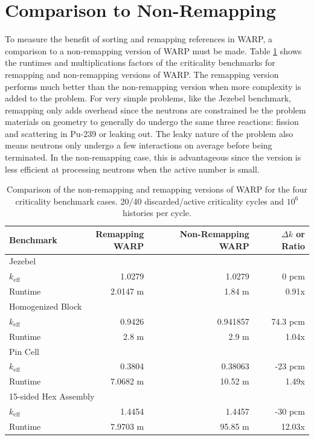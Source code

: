 \section{Comparison to Non-Remapping}

To measure the benefit of sorting and remapping references in WARP, a comparison to a non-remapping version of WARP must be made.  Table \ref{benchmark_nonremapping_summary} shows the runtimes and multiplications factors of the criticality benchmarks for remapping and non-remapping versions of WARP.  The remapping version performs much better than the non-remapping version when more complexity is added to the problem.  For very simple problems, like the Jezebel benchmark, remapping only adds overhead since the neutrons are constrained be the problem materials on geometry to generally do undergo the same three reactions: fission and scattering in Pu-239 or leaking out.  The leaky nature of the problem also means neutrons only undergo a few interactions on average before being terminated.  In the non-remapping case, this is advantageous since the version is less efficient at processing neutrons when the active number is small.

\begin{table}[h]
\centering
\caption{Comparison of the non-remapping and remapping versions of WARP for the four criticality benchmark cases.  20/40 discarded/active criticality cycles and $10^6$ histories per cycle.}
\label{benchmark_nonremapping_summary}
\begin{tabular}{| l | r | r | r |}
 \hline
 Benchmark & Remapping WARP & Non-Remapping WARP & $\Delta k$ or Ratio  \\
\hline
\hline
\multicolumn{4}{|l|}{Jezebel}  \\
\hline
 $k_\mathrm{eff}$ & 1.0279 & 1.0279  & 0 pcm\\
 \hline
 Runtime               &   2.0147 m & 1.84 m & 0.91x \\
 \hline
 \hline
\multicolumn{4}{|l|}{Homogenized Block }\\
\hline
 $k_\mathrm{eff}$ & 0.9426 & 0.941857 & 74.3 pcm  \\
 \hline
 Runtime               &  2.8 m & 2.9 m & 1.04x \\
 \hline
  \hline
\multicolumn{4}{|l|}{Pin Cell}\\
\hline
 $k_\mathrm{eff}$ &  0.3804 & 0.38063  & -23 pcm \\
 \hline
 Runtime               & 7.0682 m & 10.52 m & 1.49x \\
 \hline
  \hline
\multicolumn{4}{|l|}{15-sided Hex Assembly}\\
\hline
 $k_\mathrm{eff}$  & 1.4454  & 1.4457 & -30 pcm \\
 \hline
 Runtime               & 7.9703 m & 95.85 m & 12.03x \\
 \hline
\end{tabular}
\end{table}

